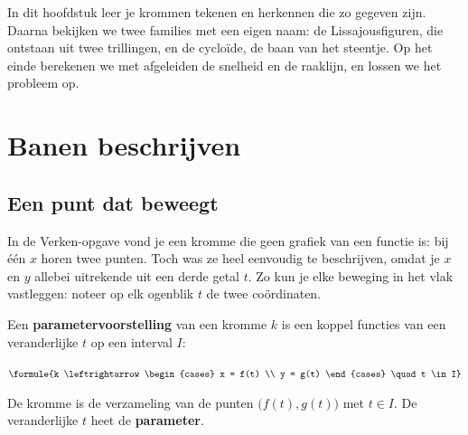 In dit hoofdstuk leer je krommen tekenen en herkennen die zo gegeven zijn. Daarna bekijken we twee families met een eigen naam: de Lissajousfiguren, die ontstaan uit twee trillingen, en de cycloïde, de baan van het steentje. Op het einde berekenen we met afgeleiden de snelheid en de raaklijn, en lossen we het probleem op.

\begin{oefeningen}[Start]

\end{oefeningen}


\section{Banen beschrijven}

\subsection{Een punt dat beweegt}

In de Verken-opgave vond je een kromme die geen grafiek van een functie is: bij één $x$ horen twee punten. Toch was ze heel eenvoudig te beschrijven, omdat je $x$ en $y$ allebei uitrekende uit een derde getal $t$. Zo kun je elke beweging in het vlak vastleggen: noteer op elk ogenblik $t$ de twee coördinaten.

\begin{theorie}
Een \textbf{\textcolor{accent}{parametervoorstelling}} van een kromme $k$ is een koppel functies van een veranderlijke $t$ op een interval $I$:

\vspace{1mm}
\qquad $\formule{k \leftrightarrow \begin{cases} x = f(t) \\ y = g(t) \end{cases} \quad t \in I}$

\vspace{1mm}
De kromme is de verzameling van de punten $\bigl(f(t), g(t)\bigr)$ met $t \in I$. De veranderlijke $t$ heet de \textbf{\textcolor{accent}{parameter}}.
\end{theorie}

